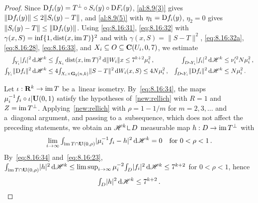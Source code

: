 \begin{proof}
    Since $\mathrm{D} f_i(y) = T^\perp \circ S_i(y) \circ \mathrm{D} F_i(y)$, \ref{al:8.9(3)} gives $\|\mathrm{D}
    f_i(y)\| \le 2 \|S_i(y) - T\|$, and \ref{al:8.9(5)} with $\eta_1 = \mathrm{D} f_i(y)$, $\eta_2 = 0$
    gives $\|S_i(y) - T\| \le \|\mathrm{D} f_i(y)\|$. Using \eqref{eq:8.16:31}, \eqref{eq:8.16:32}
    with $\gamma(x,S) = \inf \{ 1, \operatorname{dist}(x, \operatorname{im} T) \}^2$ and with $\gamma(x,S) = \|S - T\|^2$,
    \eqref{eq:8.16:32a}, \eqref{eq:8.16:28}, \eqref{eq:8.16:33}, and $X_i \subseteq O \subseteq
    \mathbf{C} ( U_i, 0, 7 )$, we estimate
    \begin{gather}
        \label{eq:8.16:34}
        \begin{aligned}
            {\textstyle\int_{Y_i}^{}} |f_i|^2 \,\mathrm{d} \mathscr{H}^{k} & \le {\textstyle\int_{X_i}^{}} \operatorname{dist}(x, \operatorname{im} T)^2 \,\mathrm{d}
            \|W_i\| x \le 7^{k+2} \mu_i^2 \,, & {\textstyle\int_{D \!\sim\! Y_i}^{}} |f_i|^2 \,\mathrm{d}
            \mathscr{H}^{k} & \le \nu_i'^2 N \mu_i^2 \,, \\
            {\textstyle\int_{Y_i}^{}} \|\mathrm{D} f_i\|^2 \,\mathrm{d} \mathscr{H}^{k} & \le 4 {\textstyle\int_{X_i \times
            \mathbf{G}_{\natural}(n,k)}^{}} \|S - T\|^2 \,\mathrm{d} W_i(x,S) \le 4 N \mu_i^2 \,, &
            {\textstyle\int_{D \!\sim\! Y_i}^{}} \|\mathrm{D} f_i\|^2 \,\mathrm{d} \mathscr{H}^{k} & \le N \mu_i^2 \,.
        \end{aligned}
    \end{gather}

    Let $\iota : \mathbf{R}^{k} \to \operatorname{im} T$ be a~linear isometry. By~\eqref{eq:8.16:34}, the maps
    $\mu_i^{-1} f_i \circ \iota | \mathbf{U}(0,1)$ satisfy the hypotheses of~\ref{new:rellich} with $R
    = 1$ and $Z = \operatorname{im} T^\perp$. Applying~\ref{new:rellich} with $\rho = 1 - 1/m$ for $m = 2, 3,
    \ldots$ and a~diagonal argument, and passing to a~subsequence, which does not affect the
    preceding statements, we obtain an $\HM^{\vdim} \restrict D$ measurable map $h : D \to \operatorname{im}
    T^\perp$ with
    \begin{equation}
        \label{eq:8.16:35}
        \lim_{i \to \infty} {\textstyle\int_{\operatorname{im} T \cap \mathbf{U}(0,\rho)}^{}} |\mu_i^{-1} f_i - h|^2 \,\mathrm{d}
        \mathscr{H}^{k} = 0 \quad \text{for $0 < \rho < 1$} \,.
    \end{equation}
    By~\eqref{eq:8.16:34} and~\eqref{eq:8.16:23}, ${\textstyle\int_{\operatorname{im} T \cap \mathbf{U}(0,\rho)}^{}} |h|^2
    \,\mathrm{d} \mathscr{H}^{k} \le \limsup_{i \to \infty} \mu_i^{-2} {\textstyle\int_{D}^{}} |f_i|^2 \,\mathrm{d} \mathscr{H}^{k} \le
    7^{k+2}$ for $0 < \rho < 1$, hence
    \begin{equation}
        \label{eq:8.16:36}
        {\textstyle\int_{D}^{}} |h|^2 \,\mathrm{d} \mathscr{H}^{k} \le 7^{k+2} \,.
    \end{equation}


\end{proof}
